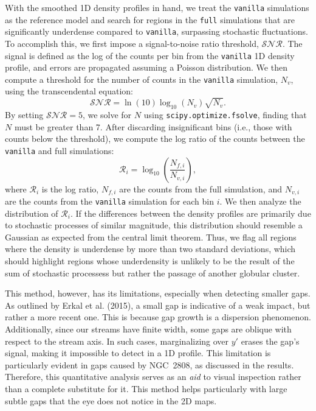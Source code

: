 \documentclass[draft]{aa}
\begin{document}
      With the smoothed 1D density profiles in hand, we treat the \texttt{vanilla} simulations as the reference model and search for regions in the \texttt{full} simulations that are significantly underdense compared to \texttt{vanilla}, surpassing stochastic fluctuations. To accomplish this, we first impose a signal-to-noise ratio threshold, $\mathcal{SNR}$. The signal is defined as the log of the counts per bin from the \texttt{vanilla} 1D density profile, and errors are propagated assuming a Poisson distribution. We then compute a threshold for the number of counts in the \texttt{vanilla} simulation, $N_v$, using the transcendental equation:
      \begin{equation}
          \mathcal{SNR} = \ln(10) \log_{10}\left(N_v\right) \sqrt{N_v}.
        \end{equation} \label{eq:density_threshold}
      By setting $\mathcal{SNR} = 5$, we solve for $N$ using \texttt{scipy.optimize.fsolve}, finding that $N$ must be greater than 7. After discarding insignificant bins (i.e., those with counts below the threshold), we compute the log ratio of the counts between the \texttt{vanilla} and full simulations:
      \begin{equation}
          \mathcal{R}_i = \log_{10}\left(\frac{N_{f,i}}{N_{v,i}}\right),
        \end{equation}
      where $\mathcal{R}_i$ is the log ratio, $N_{f,i}$ are the counts from the full simulation, and $N_{v,i}$ are the counts from the \texttt{vanilla} simulation for each bin $i$. We then analyze the distribution of $\mathcal{R}_i$. If the differences between the density profiles are primarily due to stochastic processes of similar magnitude, this distribution should resemble a Gaussian as expected from the central limit theorem. Thus, we flag all regions where the density is underdense by more than two standard deviations, which should highlight regions whose underdensity is unlikely to be the result of the sum of stochastic processess but rather the passage of another globular cluster. 

      This method, however, has its limitations, especially when detecting smaller gaps. As outlined by Erkal et al. (2015), a small gap is indicative of a weak impact, but rather a more recent one. This is because gap growth is a dispersion phenomenon. Additionally, since our streams have finite width, some gaps are oblique with respect to the stream axis. In such cases, marginalizing over $y'$ erases the gap's signal, making it impossible to detect in a 1D profile. This limitation is particularly evident in gaps caused by NGC~2808, as discussed in the results. Therefore, this quantitative analysis serves as an \textit{aid} to visual inspection rather than a complete substitute for it. This method helps particularly with large subtle gaps that the eye does not notice in the 2D maps.
\end{document}

